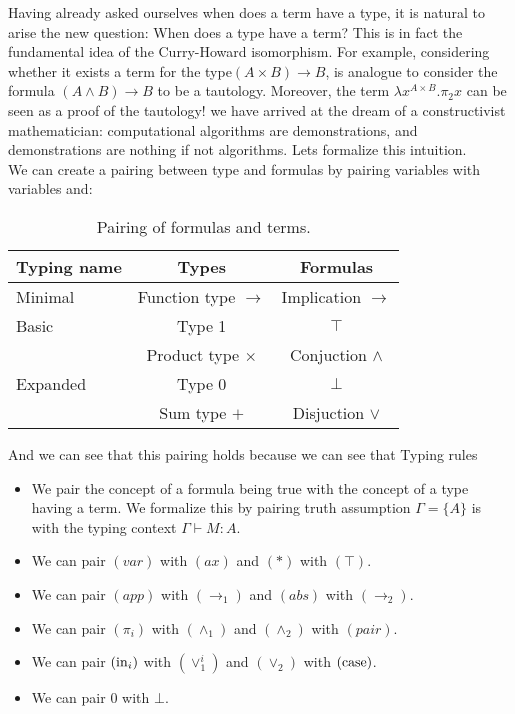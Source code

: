 Having already asked ourselves when does a term have a type, it is natural to arise the new question: When does a type have a term? This is in fact the fundamental idea of the Curry-Howard isomorphism. For example, considering whether it exists a term for the type$(A \times B) \to B$, is analogue to consider the formula $(A\land B)\to B$ to be a tautology. Moreover, the term $\lambda x^{A\times B}. \pi_2 x$ can be seen as a proof of the tautology! we have arrived at the dream of a constructivist mathematician: computational algorithms are demonstrations, and demonstrations are nothing if not algorithms. Lets formalize this intuition.\\


We can create a pairing between type and formulas by pairing variables with variables and:
\begin{table}[!h]
  \begin{center}
    \begin{tabular}{|l|c|c|}
      \hline
      Typing name & Types  & Formulas  \\
      \hline
      Minimal     & Function type $\to$   & Implication $\to$  \\
      \hline 
      Basic      & Type 1 & $\top$ \\
                  & Product type $\times$ & Conjuction $\land$ \\
      \hline
      Expanded   & Type 0 & $\bot$ \\
                  & Sum type $+$     & Disjuction $\lor$ \\
      \hline
    \end{tabular}
    \caption*{\label{tab:table-name} Pairing of formulas and terms.}
  \end{center}
\end{table}

And we can see that this pairing holds because we can see that Typing rules 

\begin{itemize}
\item We pair the concept of a formula being true with the concept of a type having a term. We formalize this by pairing truth assumption $\Gamma=\{A\}$ is with the typing context $\Gamma\vdash M:A$. 
\item We can pair $(var)$ with $(ax)$ and $(*)$ with $(\top)$.
\item We can pair $(app)$ with $(\to_1)$ and $(abs)$ with $(\to_2)$.
\item We can pair $(\pi_i)$ with $(\land_1)$ and $(\land_2)$ with $(pair)$.
\item We can pair $(\operatorname{in}_i)$ with $(\lor_1^i)$ and $(\lor_2)$ with $(\operatorname{case})$.
\item We can pair $0$ with $\bot$.
\end{itemize}


